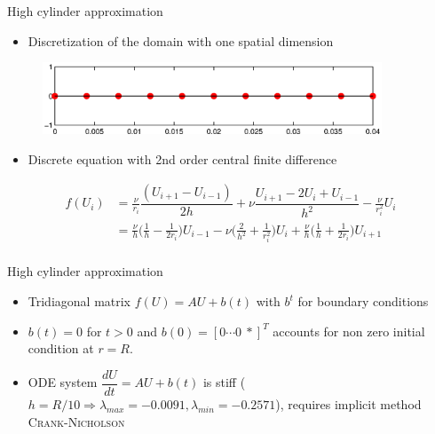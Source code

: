 \documentclass{beamer}
\begin{document}
\begin{frame}{High cylinder approximation}
\begin{itemize}
\item Discretization of the domain with one spatial dimension
\end{itemize}
\begin{figure}[!h]
\centering
\includegraphics[width = 0.9\textwidth]{./axis.eps}
\end{figure}

\begin{itemize}
\item Discrete equation with 2nd order central finite difference
\end{itemize}
\begin{align*}
f(U_i ) &= \frac{\nu}{r_i}\dfrac{(U_{i+1}-U_{i-1})}{2h}+\nu\dfrac{U_{i+1}-2U_{i}+U_{i-1}}{h^{2}} -\frac{\nu}{r_{i}^2}U_{i}\\
&= \frac{\nu}{h}\Big( \frac{1}{h} - \frac{1}{2r_i}\Big)U_{i-1} 
 -\nu\Big( \frac{2}{h^2} + \frac{1}{r_{i}^{2}}\Big)U_{i}
+ \frac{\nu}{h}\Big( \frac{1}{h} + \frac{1}{2r_i}\Big)U_{i+1}\\
\end{align*} 
\end{frame}

\begin{frame}{High cylinder approximation}

\begin{itemize}
\item Tridiagonal matrix $f(U) = AU+b(t)$ with $b^t$ for boundary conditions
\item $b(t) =0$ for $t>0$ and $b(0)  = [0 \cdots 0  ~*]^{T}$ accounts for non zero initial condition at $r=R$.
\item ODE system $\dfrac{dU}{dt}=AU + b(t)$ is stiff ($h=R/10 \Longrightarrow \lambda_{max} = -0.0091, \lambda_{min}=-0.2571$), requires implicit method \textsc{Crank-Nicholson}
\end{itemize}
\end{frame}
\end{document}
